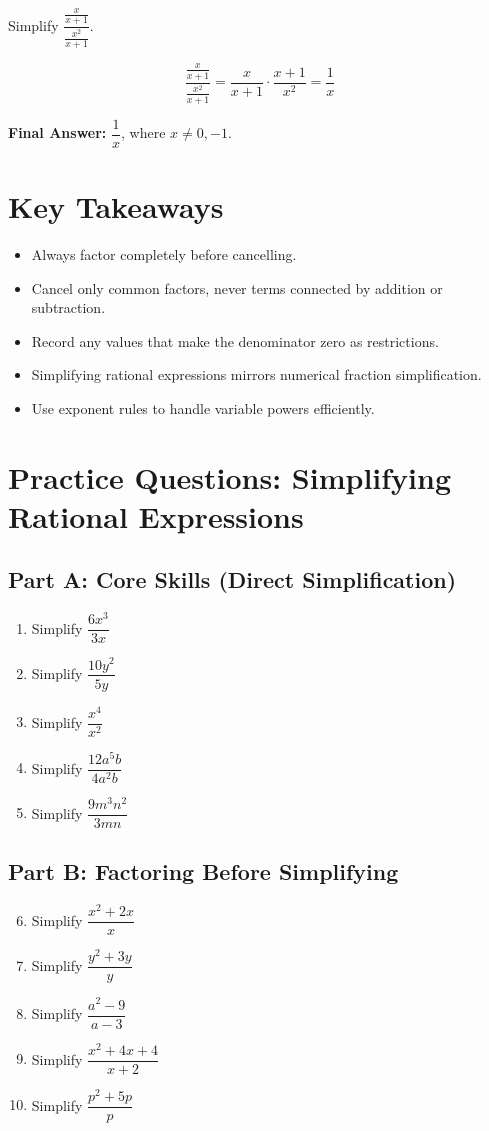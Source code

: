 \documentclass[14pt]{extarticle}
\begin{document}
Simplify \(\dfrac{\frac{x}{x+1}}{\frac{x^2}{x+1}}\).

\[
\dfrac{\frac{x}{x+1}}{\frac{x^2}{x+1}} = \frac{x}{x+1} \cdot \frac{x+1}{x^2} = \frac{1}{x}
\]

\textbf{Final Answer:} \(\boxed{\dfrac{1}{x}}\), where \(x \ne 0, -1.\)

\section*{Key Takeaways}
\begin{itemize}
  \item Always factor completely before cancelling.
  \item Cancel only common factors, never terms connected by addition or subtraction.
  \item Record any values that make the denominator zero as restrictions.
  \item Simplifying rational expressions mirrors numerical fraction simplification.
  \item Use exponent rules to handle variable powers efficiently.
\end{itemize}

\newpage


\section*{Practice Questions: Simplifying Rational Expressions}

\subsection*{Part A: Core Skills (Direct Simplification)}
\begin{enumerate}
  \item Simplify \(\dfrac{6x^3}{3x}\)
  \item Simplify \(\dfrac{10y^2}{5y}\)
  \item Simplify \(\dfrac{x^4}{x^2}\)
  \item Simplify \(\dfrac{12a^5b}{4a^2b}\)
  \item Simplify \(\dfrac{9m^3n^2}{3mn}\)
\end{enumerate}

\subsection*{Part B: Factoring Before Simplifying}
\begin{enumerate}
  \setcounter{enumi}{5}
  \item Simplify \(\dfrac{x^2 + 2x}{x}\)
  \item Simplify \(\dfrac{y^2 + 3y}{y}\)
  \item Simplify \(\dfrac{a^2 - 9}{a - 3}\)
  \item Simplify \(\dfrac{x^2 + 4x + 4}{x + 2}\)
  \item Simplify \(\dfrac{p^2 + 5p}{p}\)
\end{enumerate}
\end{document}

